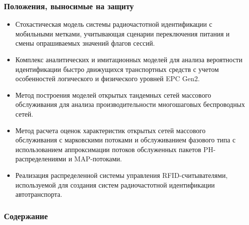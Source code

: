 \begin{frame}
    \setcounter{framenumber}{1}
    \maketitle
\end{frame}

\begin{frame}
    \frametitle{Положения, выносимые на защиту}
    \begin{itemize}
        \item Стохастическая модель системы радиочастотной идентификации с мобильными метками, учитывающая сценарии переключения питания и смены опрашиваемых значений флагов сессий.
        \item Комплекс аналитических и имитационных моделей для анализа вероятности идентификации быстро движущихся транспортных средств с учетом особенностей логического и физического уровней EPC Gen2.
        \item Метод построения моделей открытых тандемных сетей массового обслуживания для анализа производительности многошаговых беспроводных сетей.
        \item Метод расчета оценок характеристик открытых сетей массового обслуживания с марковскими потоками и обслуживанием фазового типа с использованием аппроксимации потоков обслуженных пакетов PH-распределениями и MAP-потоками.
        \item Реализация распределенной системы управления RFID-считывателями, используемой для создания систем радиочастотной идентификации автотранспорта.    \end{itemize}
\end{frame}

\begin{frame}
    \frametitle{Содержание}
    \tableofcontents
\end{frame}
